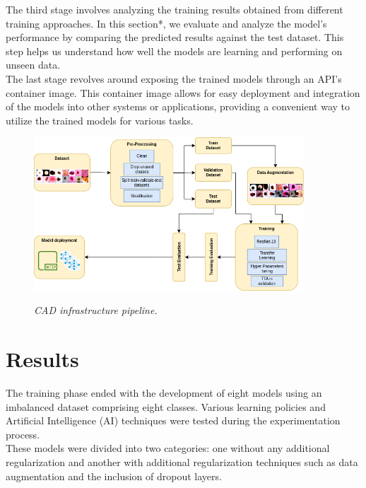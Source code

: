 The third stage involves analyzing the training results obtained from different
training approaches. In this section*, we evaluate and analyze the model's
performance by comparing the predicted results against the test dataset. This
step helps us understand how well the models are learning and performing on
unseen data. \\

The last stage revolves around exposing the trained models through an API's
container image. This container image allows for easy deployment and
integration of the models into other systems or applications, providing a
convenient way to utilize the trained models for various tasks. \\


\begin{figure}[H]
  \centering
  \includegraphics[width=0.9\textwidth]{imatges/methodological_contribution/Pipeline.drawio.png}
  \caption[CAD infrastructure pipeline]{\textit{CAD infrastructure pipeline. }}
  {\label{fig:cad-infrastructure-training-system}}
\end{figure}

\section*{Results}

The training phase ended with the development of eight models using an
imbalanced dataset comprising eight classes. Various learning policies and
Artificial Intelligence (AI) techniques were tested during the experimentation
process.  \\

These models were divided into two categories: one without any
additional regularization and another with additional regularization techniques
such as data augmentation and the inclusion of dropout layers.

